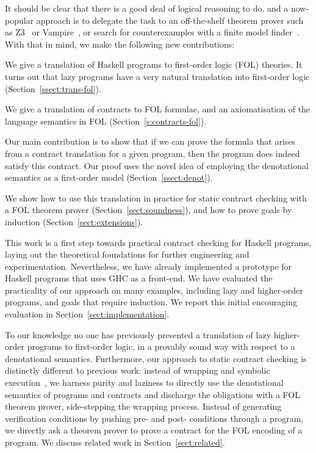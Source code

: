It should be clear that there is a good deal of logical reasoning to do,
and a now-popular approach is to delegate the task to an off-the-shelf theorem
prover such as Z3~\cite{z3citation} or Vampire~\cite{vampire}, or search for 
counterexamples with a finite model finder~\cite{paradox}.
With that in mind, we make the following new contributions:

\begin{itemize*}
  \item We give a translation of Haskell programs to first-order logic (FOL) theories. 
        It turns out that lazy programs have a very natural translation into first-order logic
        (Section~\ref{ssect:trans-fol}).
  \item We give a translation of contracts to FOL formulae, and an axiomatisation of 
        the language semantics in FOL 
        (Section~\ref{s:contracts-fol}).
  \item Our main contribution is to show that if we can prove the formula 
        that arises from a contract translation 
        for a given program, then the program does indeed satisfy this contract. Our proof
        uses the novel idea of employing the denotational 
        semantics as a first-order model (Section~\ref{ssect:denot}).
  \item We show how to use this translation in practice for static contract checking with
        a FOL theorem prover (Section~\ref{sect:soundness}), 
        and how to prove goals by induction (Section~\ref{sect:extensions}).
\end{itemize*}

This work is a first step towards practical contract checking 
for Haskell programs, laying out the theoretical foundations for further engineering 
and experimentation. Nevertheless, we have already implemented a prototype for Haskell 
programs that uses GHC as a front-end. We have evaluated the practicality of our approach 
on many examples, including lazy and higher-order programs, and goals that require 
induction. We report this initial encouraging evaluation in 
Section~\ref{sect:implementation}. 

To our knowledge no one has previously presented a translation of lazy higher-order programs to 
first-order logic, in a provably sound way with respect to a denotational
semantics. Furthermore, our approach to static contract checking is 
distinctly different to previous work: instead of wrapping and 
symbolic execution~\cite{xu+:contracts,Xu:2012:HCC:2103746.2103767}, 
we harness purity and laziness to directly use the denotational semantics
of programs and contracts and discharge the obligations with a 
FOL theorem prover, side-stepping
the wrapping process. Instead of generating verification conditions by pushing
pre- and post- conditions through a program, we directly ask a theorem prover to prove 
a contract for the FOL encoding of a program. 
We discuss related work in Section~\ref{sect:related}.

